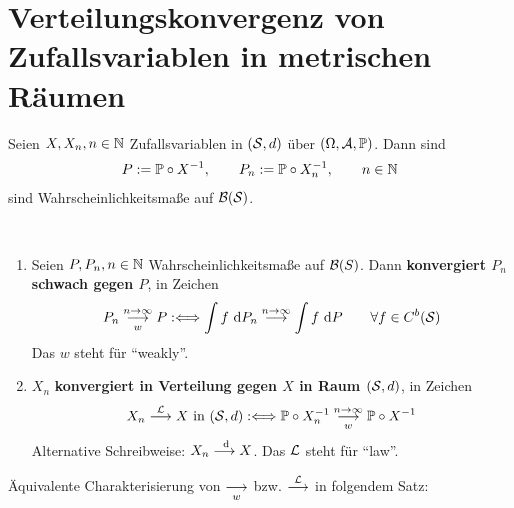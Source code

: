 \section{Verteilungskonvergenz von Zufallsvariablen in metrischen Räumen}
Seien $X,X_n,n\in\N$ Zufallsvariablen in $(\S,d)$ über $(\Omega,\A,\P)$. Dann sind
\begin{align*}
P:=\P\circ X^{-1},\qquad P_n:=\P\circ X_n^{-1},\qquad n\in\N
\end{align*}
sind Wahrscheinlichkeitsmaße auf $\B(\S)$.

\begin{definition}[Verteilungskonvergenz]\label{def4.1}\
\begin{enumerate}[label=(\arabic*)]
\item Seien $P,P_n,n\in\N$ Wahrscheinlichkeitsmaße auf $\B(S)$. Dann \textbf{konvergiert $P_n$ schwach gegen $P$}, in Zeichen
\begin{align*}
P_n\stackrelnew{w}{n\to\infty}{\longrightarrow} P
:\Longleftrightarrow
\int\limits f\d P_n\stackrel{n\to\infty}{\longrightarrow}\int\limits f\d P\qquad\forall f\in C^b(\S)
\end{align*}
Das $w$ steht für ``weakly''.
\item $X_n$ \textbf{konvergiert in Verteilung gegen $X$ in Raum $(\S,d)$}, in Zeichen
\begin{align*}
X_n\stackrel{\mathcal{L}}{\longrightarrow} X\text{ in }(\S,d)
:\Longleftrightarrow
\P\circ X_n^{-1}\stackrelnew{w}{n\to\infty}{\longrightarrow}\P\circ X^{-1}
\end{align*}
Alternative Schreibweise: $X_n\stackrel{\d}{\longrightarrow} X$. Das $\L$ steht für ``law''.
\end{enumerate}
\end{definition}

Äquivalente Charakterisierung von $\stackrelnew{w}{}{\longrightarrow}$ bzw. $\stackrel{\L}{\longrightarrow}$ in folgendem Satz:

